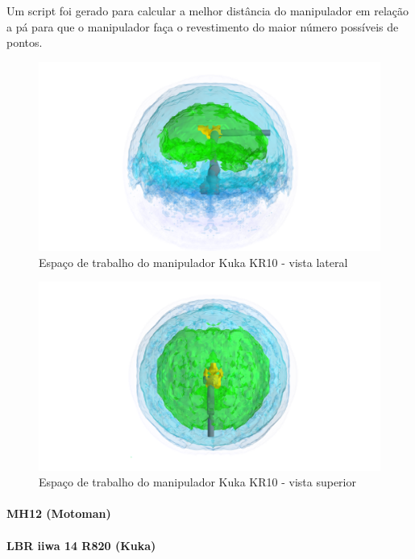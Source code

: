 Um script foi gerado para calcular a melhor distância do manipulador em relação
a pá para que o manipulador faça o revestimento do maior número possíveis de
pontos.

\begin{figure}[h!]	
	\includegraphics[width=\columnwidth]{figs/bighatch/kr10_front.png}
	\caption{Espaço de trabalho do manipulador Kuka KR10 - vista lateral}
	\label{fig::kr10cin1}
\end{figure}

\begin{figure}[h!]	
	\includegraphics[width=\columnwidth]{figs/bighatch/kr10_top.png}
	\caption{Espaço de trabalho do manipulador Kuka KR10 - vista superior}
	\label{fig::kr10cin2}
\end{figure}




\paragraph{MH12 (Motoman)}



\paragraph{LBR iiwa 14 R820 (Kuka)}
